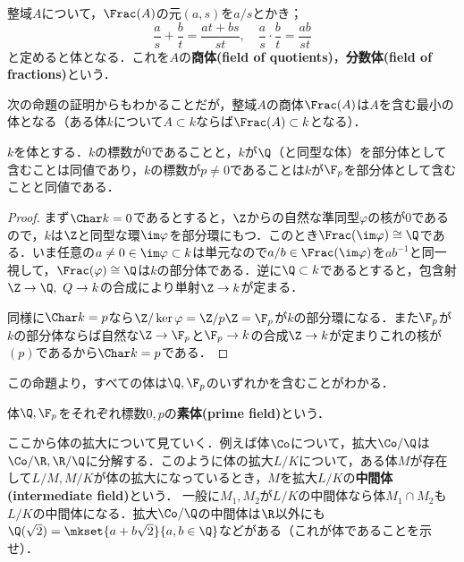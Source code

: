 \begin{defi}[商体]\label{defi:商体}
	整域$A$について，$\Frac (A)$の元$(a,s)$を$a/s$とかき；
	\[\frac{a}{s}+\frac{b}{t}=\frac{at+bs}{st},\quad \frac{a}{s}\cdot\frac{b}{t}=\frac{ab}{st}\]
	と定めると体となる．これを$A$の\textbf{商体(field of quotients)}，\textbf{分数体(field of fractions)}という．
\end{defi}

次の命題の証明からもわかることだが，整域$A$の商体$\Frac (A)$は$A$を含む最小の体となる（ある体$k$について$A\subset k$ならば$\Frac (A)\subset k$となる）．

\begin{prop}
	$k$を体とする．$k$の標数が0であることと，$k$が$\Q$（と同型な体）を部分体として含むことは同値であり，$k$の標数が$p\neq0$であることは$k$が$\F_p$を部分体として含むことと同値である．
\end{prop}

\begin{proof}
	まず$\Char k=0$であるとすると，$\Z$からの自然な準同型$\varphi$の核が$0$であるので，$k$は$\Z$と同型な環$\im\varphi$を部分環にもつ．このとき$\Frac(\im\varphi)\cong\Q$である．いま任意の$a\neq 0\in\im\varphi\subset k$は単元なので$a/b\in\Frac(\im\varphi)$を$ab^{-1}$と同一視して，$\Frac(\varphi)\cong\Q$は$k$の部分体である．逆に$\Q\subset k$であるとすると，包含射$\Z\to\Q,~Q\to k$の合成により単射$\Z\to k$が定まる．
	
	同様に$\Char k=p$なら$\Z/\ker\varphi=\Z/p\Z=\F_p$が$k$の部分環になる．また$\F_p$が$k$の部分体ならば自然な$\Z\to\F_p$と$\F_p\to k$の合成$\Z\to k$が定まりこれの核が$(p)$であるから$\Char k=p$である．
\end{proof}

この命題より，すべての体は$\Q,\F_p$のいずれかを含むことがわかる．

\begin{defi}[素体]
	体$\Q,\F_p$をそれぞれ標数$0,p$の\textbf{素体(prime field)}という．
\end{defi}

ここから体の拡大について見ていく．例えば体$\Co$について，拡大$\Co/\Q$は$\Co/\R,\R/\Q$に分解する．このように体の拡大$L/K$について，ある体$M$が存在して$L/M,M/K$が体の拡大になっているとき，$M$を拡大$L/K$の\textbf{中間体(intermediate field)}という． 一般に$M_1,M_2$が$L/K$の中間体なら体$M_1\cap M_2$も$L/K$の中間体になる．拡大$\Co/\Q$の中間体は$\R$以外にも$\Q(\sqrt{2})=\mkset{a+b\sqrt{2}}{a,b\in\Q}$などがある（これが体であることを示せ）．

